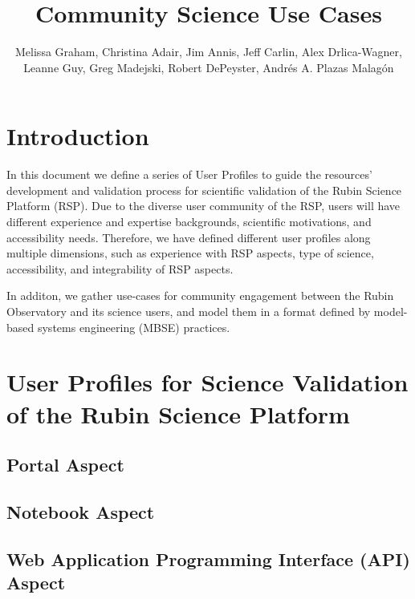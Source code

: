 \documentclass[DM,lsstdraft,authoryear,toc]{lsstdoc}
\title{Community Science Use Cases}
\author{%
Melissa Graham, Christina Adair, Jim Annis, Jeff Carlin, Alex Drlica-Wagner, Leanne Guy, Greg Madejski, Robert DePeyster, Andrés A. Plazas Malagón
}
\date{\vcsDate}
\begin{document}
\maketitle


\section{Introduction}

In this document we define a series of User Profiles to guide the resources' development and validation process for scientific validation of the Rubin Science Platform (RSP).  Due to the diverse user community of the RSP, users will have different experience and expertise backgrounds, scientific motivations, and accessibility needs. Therefore, we have defined different user profiles along multiple dimensions, such as experience with RSP aspects, type of science, accessibility, and integrability of RSP aspects.

In additon, we gather use-cases for community engagement between the Rubin Observatory and its science users, and model them in a format defined by model-based systems engineering (MBSE) practices.

\clearpage
\section{User Profiles for Science Validation of the Rubin Science Platform}

\clearpage
\subsection{Portal Aspect}


\clearpage
\subsection{Notebook Aspect}


\clearpage
\subsection{Web Application Programming Interface (API) Aspect}

\end{document}
